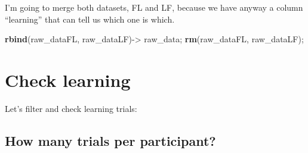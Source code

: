 \documentclass[
]{article}
\newenvironment{Shaded}{\begin{snugshade}}{\end{snugshade}}
\newcommand{\KeywordTok}[1]{\textcolor[rgb]{0.13,0.29,0.53}{\textbf{#1}}}
\newcommand{\NormalTok}[1]{#1}
\newcommand{\OperatorTok}[1]{\textcolor[rgb]{0.81,0.36,0.00}{\textbf{#1}}}
\newcommand{\StringTok}[1]{\textcolor[rgb]{0.31,0.60,0.02}{#1}}
\begin{document}
I'm going to merge both datasets, FL and LF, because we have anyway a
column ``learning'' that can tell us which one is which.

\begin{Shaded}
\begin{Highlighting}[]
\KeywordTok{rbind}\NormalTok{(raw_dataFL, raw_dataLF)->}\StringTok{ }\NormalTok{raw_data; }
\KeywordTok{rm}\NormalTok{(raw_dataFL, raw_dataLF);}
\end{Highlighting}
\end{Shaded}

\hypertarget{check-learning}{%
\section{Check learning}\label{check-learning}}

Let's filter and check learning trials:

\begin{Shaded}
\end{Shaded}

\hypertarget{how-many-trials-per-participant}{%
\subsection{How many trials per
participant?}\label{how-many-trials-per-participant}}

\begin{Shaded}
\end{Shaded}
\end{document}
